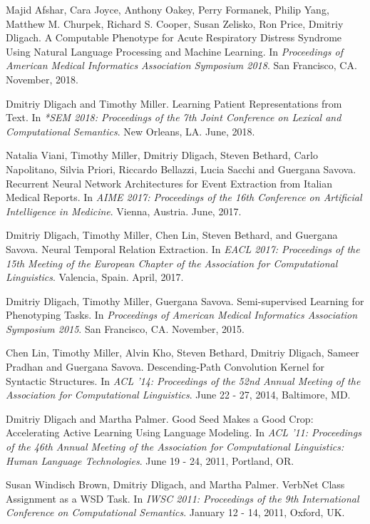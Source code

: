 \documentclass[letterpaper]{article}
\renewenvironment{itemize}{
  \begin{list}{}{
    \setlength{\leftmargin}{1.5em}
  }
}{
  \end{list}
}
\begin{document}
\begin{itemize}
\item Majid Afshar, Cara Joyce, Anthony Oakey, Perry Formanek, Philip Yang, Matthew M. Churpek, Richard S. Cooper, Susan Zelisko, Ron Price, Dmitriy Dligach. A Computable Phenotype for Acute Respiratory Distress Syndrome Using Natural Language Processing and Machine Learning. In \emph{Proceedings of American Medical Informatics Association Symposium 2018}. San Francisco, CA. November, 2018.
\item Dmitriy Dligach and Timothy Miller. Learning Patient Representations from Text. In \emph{*SEM 2018: Proceedings of the 7th Joint Conference on Lexical and Computational Semantics}. New Orleans, LA. June, 2018.
\item Natalia Viani, Timothy Miller, Dmitriy Dligach, Steven Bethard, Carlo Napolitano, Silvia Priori, Riccardo Bellazzi, Lucia Sacchi and Guergana Savova. Recurrent Neural Network Architectures for Event Extraction from Italian Medical Reports. In \emph{AIME 2017: Proceedings of the 16th Conference on Artificial Intelligence in Medicine}. Vienna, Austria. June, 2017.
\item Dmitriy Dligach, Timothy Miller, Chen Lin, Steven Bethard, and Guergana Savova. Neural Temporal Relation Extraction. In \emph{EACL 2017: Proceedings of the 15th Meeting of the European Chapter of the Association
for Computational Linguistics}. Valencia, Spain. April, 2017.
\item Dmitriy Dligach, Timothy Miller, Guergana Savova. Semi-supervised Learning for Phenotyping Tasks. In \emph{Proceedings of American Medical Informatics Association Symposium 2015}. San Francisco, CA. November, 2015.
\item Chen Lin, Timothy Miller, Alvin Kho, Steven Bethard, Dmitriy Dligach, Sameer Pradhan and Guergana Savova. Descending-Path Convolution Kernel for Syntactic Structures. In \emph {ACL '14: Proceedings of the 52nd Annual Meeting of the Association for Computational Linguistics}. June 22 - 27, 2014, Baltimore, MD.
\item Dmitriy Dligach and Martha Palmer. Good Seed Makes a Good Crop: Accelerating Active Learning Using Language Modeling. In \emph {ACL '11: Proceedings of the 46th Annual Meeting of the Association for Computational Linguistics: Human Language Technologies}. June 19 - 24, 2011, Portland, OR.
\item Susan Windisch Brown, Dmitriy Dligach, and Martha Palmer. VerbNet Class Assignment as a WSD Task. In \emph {IWSC 2011: Proceedings of the 9th International Conference on Computational Semantics}. January 12 - 14, 2011, Oxford, UK.

\end{itemize}
\end{document}

